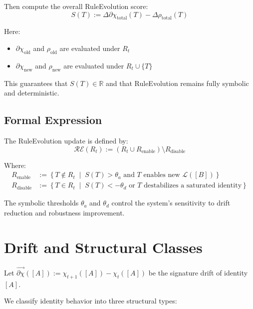 Then compute the overall RuleEvolution score:
\begin{equation} \label{eq:ruleevolution-score}
S(T) := \Delta \partial \chi_{\text{total}}(T) - \Delta \rho_{\text{total}}(T)
\end{equation}

Here:
\begin{itemize}
  \item $\partial \chi_{\text{old}}$ and $\rho_{\text{old}}$ are evaluated under $R_t$
  \item $\partial \chi_{\text{new}}$ and $\rho_{\text{new}}$ are evaluated under $R_t \cup \{T\}$
\end{itemize}

This guarantees that $S(T) \in \mathbb{R}$ and that RuleEvolution remains fully symbolic and deterministic.

\subsection{Formal Expression} \label{formal-expression}

The RuleEvolution update is defined by:
\begin{equation} \label{eq:ruleevolution-update}
\mathcal{RE}(R_t) := \left( R_t \cup R_{\text{enable}} \right) \setminus R_{\text{disable}}
\end{equation}

Where:
\begin{align*}
R_{\text{enable}} &:= \left\{ T \notin R_t \;\middle|\; S(T) > \theta_a \text{ and } T \text{ enables new } \mathcal{L}([B]) \right\} \\
R_{\text{disable}} &:= \left\{ T \in R_t \;\middle|\; S(T) < -\theta_d \text{ or } T \text{ destabilizes a saturated identity} \right\}
\end{align*}

The symbolic thresholds $\theta_a$ and $\theta_d$ control the system’s sensitivity to drift reduction and robustness improvement.

\section{Drift and Structural Classes} \label{drift-and-structural-classes}

Let $\vec{\partial \chi}([A]) := \chi_{t+1}([A]) - \chi_t([A])$ be the signature drift of identity $[A]$.

We classify identity behavior into three structural types:

